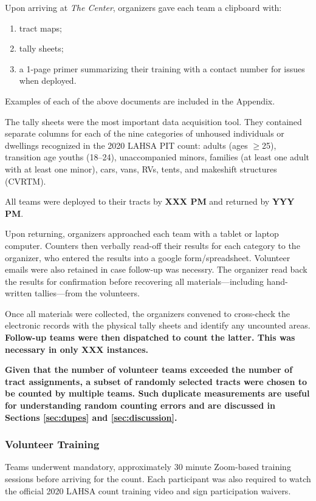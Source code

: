 \documentclass[11pt,twocolumn]{article}
\def\bfr{\bf\color{red}}
\def\Count{count}
\begin{document}
Upon arriving at {\it The Center}, organizers gave each team a clipboard with:
\begin{enumerate}
	\item tract maps;
	\item tally sheets;
	\item a 1-page primer summarizing their training with a contact number for issues when deployed.
\end{enumerate}
Examples of each of the above documents are included in the Appendix.

The tally sheets were the most important data acquisition tool. They contained separate columns for
each of the nine categories of unhoused individuals or dwellings recognized in the 2020 LAHSA PIT
count: adults (ages $\geq$25),  transition age youths (18--24), unaccompanied minors, families 
(at least one adult with at least one minor), cars, vans, RVs, tents, and makeshift structures (CVRTM). 

All teams were deployed to their tracts by {\bfr XXX PM} and returned by {\bfr YYY PM}.

Upon returning, organizers approached each team with a tablet or laptop computer. Counters 
then verbally read-off their results for each category to the organizer, who entered the results into a 
google form/spreadsheet. Volunteer emails were also retained in case follow-up was necessry. The 
organizer read back the results for confirmation before recovering all materials---including hand-written 
tallies---from the volunteers.

Once all materials were collected, the organizers convened to cross-check the electronic records
with the physical tally sheets and identify any uncounted areas. {\bfr Follow-up teams were then 
dispatched to count the latter. This was necessary in only XXX instances.} 

{\bfr Given that the number of volunteer teams exceeded the number of tract assignments, a
subset of randomly selected tracts were chosen to be counted by multiple teams. Such duplicate 
measurements are useful for understanding random counting errors and are discussed in Sections 
\ref{sec:dupes} and \ref{sec:discussion}.}

\subsubsection{Volunteer Training}
\label{sec:training}

Teams underwent mandatory, approximately 30 minute Zoom-based training sessions before arriving 
for the \Count. Each participant was also required to watch the official 2020 LAHSA count training video 
and sign participation waivers.
\end{document}
